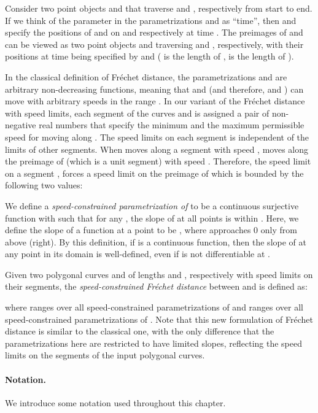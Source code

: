 \documentclass[12pt]{dalthesis}
\newcommand{\Frechet}{Fr\'echet }
\begin{document}
Consider two point objects  and  that traverse  and , respectively 
from start to end.
If we think of the parameter  in the parametrizations  and 
as ``time'', then  and  
specify the positions of 
 and  on  and  respectively at time .
The preimages of  and  can be viewed as
two point objects  and  traversing
 and , respectively,
with their positions at time  being specified by  and 
( is the length of ,  is the length of ).

In the classical definition of \Frechet distance,
the parametrizations  and  are
arbitrary non-decreasing functions, 
meaning that  and  (and therefore,  and )
can move with arbitrary speeds in the range .
In our variant of the \Frechet distance with speed limits,
each segment  of the curves  and 
is assigned a pair of non-negative real numbers  
that specify the minimum and the maximum permissible speed for moving along .
The speed limits on each segment is independent of the limits of other segments.
When  moves along a segment  with speed , 
 moves along the preimage of  (which is a unit segment) with speed .
Therefore, the speed limit  on a segment ,
forces a speed limit on the preimage of  which is bounded by the following two values:


We define a {\em speed-constrained parametrization of \/}
to be a continuous surjective function  with 
such that for any ,
the slope
of  at all points  is within . 
Here, we define the slope of a function  at a point  to be 
, where  approaches 0 only from above (right).
By this definition, if  is a continuous function, 
then the slope of  at any point  in its domain is well-defined,
even if  is not differentiable at . 

Given two polygonal curves  and  of lengths  and , respectively 
with speed limits on their segments, 
the {\em speed-constrained \Frechet distance\/} between  and  
is defined as:

where  ranges over all speed-constrained parametrizations of  
and  ranges over all speed-constrained parametrizations of .
Note that this new formulation of \Frechet distance is similar to the classical one,
with the only difference that the parametrizations here are restricted to have
limited slopes, reflecting the speed limits on the segments of the input polygonal curves.






\paragraph{Notation.}
We introduce some notation used throughout this chapter.
\end{document}
